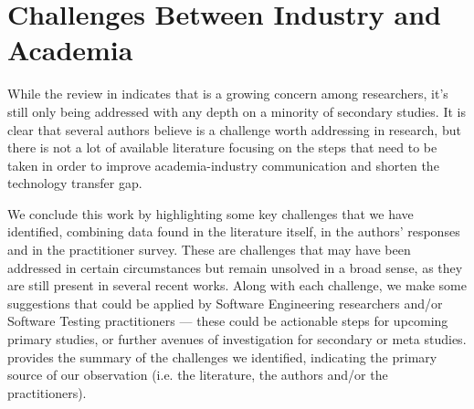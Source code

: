 \chapter{Challenges Between Industry and Academia}\label{chap:gap}


While the review in  indicates that \rea is a growing concern among \rt researchers, it's still only being addressed with any depth on a minority of secondary studies.
It is clear that several authors believe \rea is a challenge worth addressing in research, but there is not a lot of available \rt literature focusing on the steps that need to be taken in order to improve academia-industry communication and shorten the technology transfer gap.

We conclude this work by highlighting some key challenges that we have identified, combining data found in the literature itself, in the authors' responses and in the practitioner survey.
These are challenges that may have been addressed in certain circumstances but remain unsolved in a broad sense, as they are still present in several recent works.
Along with each challenge, we make some suggestions that could be applied by Software Engineering researchers and/or Software Testing practitioners --- these could be actionable steps for upcoming primary studies, or further avenues of investigation for secondary or meta studies.
 provides the summary of the challenges we identified, indicating the primary source of our observation (i.e. the literature, the authors and/or the practitioners).

